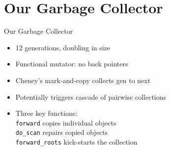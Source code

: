 \documentclass[usenames, xcolor=dvipsnames]{beamer}
\begin{document}
\section{Our Garbage Collector}

\begin{frame}{Our Garbage Collector}
  \begin{itemize}
  \item 12 generations, doubling in size
  \item Functional mutator: no back pointers
  \pause
  \item Cheney's mark-and-copy collects gen to next
  \item Potentially triggers cascade of pairwise collections
  \pause
  \item Three key functions: 
  \\\hspace{1em}\texttt{forward} copies individual objects
  \\\hspace{1em}\texttt{do\_scan} repairs copied objects
  \\\hspace{1em}\texttt{forward\_roots} kick-starts the collection
  \end{itemize}
\end{frame}
\end{document}

